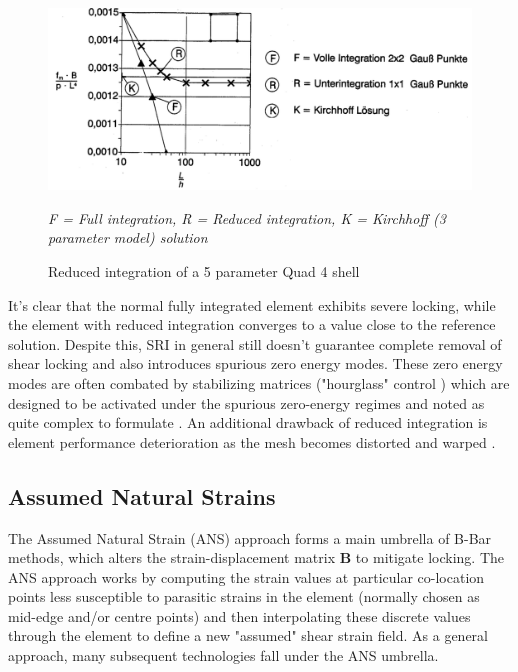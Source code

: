 \begin{figure}[H]
	\centering
	\def\svgwidth{\columnwidth}
	\includegraphics[width=14cm]{images/shearlockingredint.png}
	\caption{Reduced integration of a 5 parameter Quad 4 shell \cite{Bletz16}}
	\textit{F = Full integration, R = Reduced integration, K = Kirchhoff (3 parameter model) solution}
	\label{shearlockingredint}
\end{figure}

It's clear that the normal fully integrated element exhibits severe locking, while the element with reduced integration converges to a value close to the reference solution. Despite this, SRI in general still doesn't guarantee complete removal of shear locking and also introduces spurious zero energy modes. These zero energy modes are often combated by stabilizing matrices ("hourglass" control \cite{Zien2Vol2000}) which are designed to be activated under the spurious zero-energy regimes and noted as quite complex to formulate \cite{Mohan97}. An additional drawback of reduced integration is element performance deterioration as the mesh becomes distorted and warped \cite{Nguyen2009} \cite{Yang2000}.

\subsection{Assumed Natural Strains}

The Assumed Natural Strain (ANS) approach forms a main umbrella of B-Bar methods, which alters the strain-displacement matrix $\mathbf{B}$ to mitigate locking. The ANS approach \cite{MACNEAL1982} works by computing the strain values at particular co-location points less susceptible to parasitic strains in the element (normally chosen as mid-edge and/or centre points) and then interpolating these discrete values through the element to define a new "assumed" shear strain field. As a general approach, many subsequent technologies fall under the ANS umbrella.

